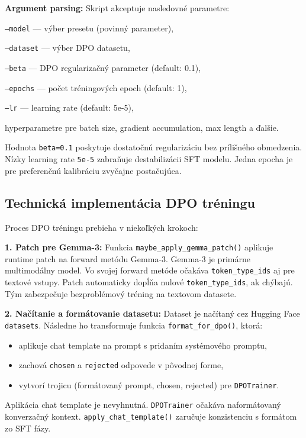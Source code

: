 \textbf{Argument parsing:} Skript akceptuje nasledovné parametre:\par\medskip
\noindent\texttt{--model} — výber presetu (povinný parameter),\par\medskip
\noindent\texttt{--dataset} — výber DPO datasetu,\par\medskip
\noindent\texttt{--beta} — DPO regularizačný parameter (default: 0.1),\par\medskip
\noindent\texttt{--epochs} — počet tréningových epoch (default: 1),\par\medskip
\noindent\texttt{--lr} — learning rate (default: 5e-5),\par\medskip
\noindent hyperparametre pre batch size, gradient accumulation, max length a ďalšie.\par\medskip
 
Hodnota \texttt{beta=0.1} poskytuje dostatočnú regularizáciu bez prílišného obmedzenia. Nízky learning rate \texttt{5e-5} zabraňuje destabilizácii SFT modelu. Jedna epocha je pre preferenčnú kalibráciu zvyčajne postačujúca.
 
\subsection{Technická implementácia DPO tréningu}
 
Proces DPO tréningu prebieha v niekoľkých krokoch:
 
\textbf{1. Patch pre Gemma-3:} Funkcia \texttt{maybe\_apply\_gemma\_patch()} aplikuje runtime patch na forward metódu Gemma-3. Gemma-3 je primárne multimodálny model. Vo svojej forward metóde očakáva \texttt{token\_type\_ids} aj pre textové vstupy. Patch automaticky dopĺňa nulové \texttt{token\_type\_ids}, ak chýbajú. Tým zabezpečuje bezproblémový tréning na textovom datasete.
 
\textbf{2. Načítanie a formátovanie datasetu:} Dataset je načítaný cez Hugging Face \texttt{datasets}. Následne ho transformuje funkcia \texttt{format\_for\_dpo()}, ktorá:
\begin{itemize}
    \item aplikuje chat template na prompt s pridaním systémového promptu,
    \item zachová \texttt{chosen} a \texttt{rejected} odpovede v pôvodnej forme,
    \item vytvorí trojicu (formátovaný prompt, chosen, rejected) pre \texttt{DPOTrainer}.
\end{itemize}
 
Aplikácia chat template je nevyhnutná. \texttt{DPOTrainer} očakáva naformátovaný konverzačný kontext. \texttt{apply\_chat\_template()} zaručuje konzistenciu s formátom zo SFT fázy.
 
